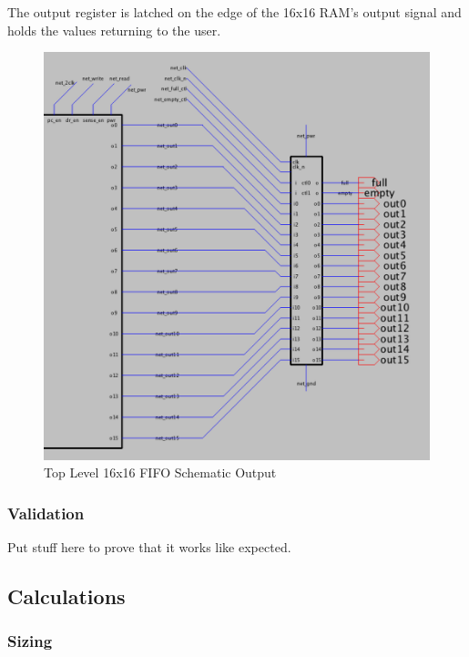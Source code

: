\documentclass[a4paper]{article}
\begin{document}
The output register is latched on the edge of the 16x16 RAM's output signal and holds the values returning to the user.

\begin{figure}[H]
	\centering
	\includegraphics[scale=0.4]{topLevelSchematicRight}
	\caption{Top Level 16x16 FIFO Schematic Output}
	\label{fig:topLevelSchematicRight}
\end{figure}

\subsubsection{Validation}
Put stuff here to prove that it works like expected.

\subsection{Calculations}
\label{sec:calculations}

\subsubsection{Sizing}
\label{subsec:sizing_calc}
\end{document}

